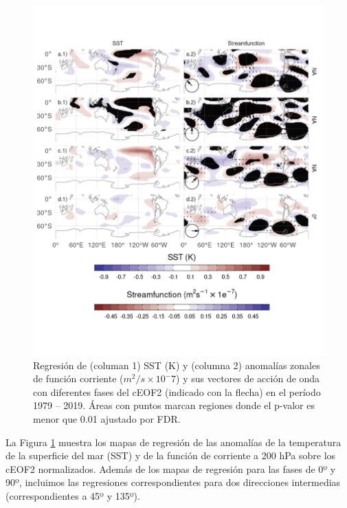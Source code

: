 \documentclass[12pt,oneside]{reedthesis}
\begin{document}
\begin{figure}
\includegraphics{figures/20-ceofs/sst-psi-2-1} \caption{Regresión de (columan 1) SST (K) y (columna 2) anomalías zonales de función corriente (\(m^2/s\times10^-7\)) y sus vectores de acción de onda con diferentes fases del cEOF2 (indicado con la flecha) en el período 1979 -- 2019.
Áreas con puntos marcan regiones donde el p-valor es menor que 0.01 ajustado por FDR.}\label{fig:sst-psi-2}
\end{figure}

La Figura \ref{fig:sst-psi-2} muestra los mapas de regresión de las anomalías de la temperatura de la superficie del mar (SST) y de la función de corriente a 200 hPa sobre los cEOF2 normalizados.
Además de los mapas de regresión para las fases de 0º y 90º, incluimos las regresiones correspondientes para dos direcciones intermedias (correspondientes a 45º y 135º).
\end{document}
